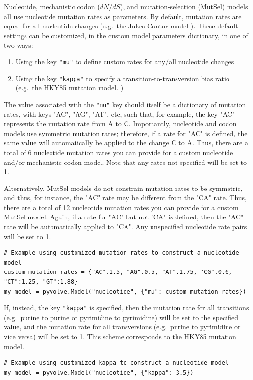 \documentclass{article}
\newcommand{\code}[1]{\texttt{\small{#1}}}
\begin{document}
Nucleotide, mechanistic codon ($dN/dS$), and mutation-selection (MutSel) models all use nucleotide mutation rates as parameters. By default, mutation rates are equal for all nucleotide changes (e.g.\ the Jukes Cantor model \citep{JC69}). These default settings can be customized, in the custom model parameters dictionary, in one of two ways:
\begin{enumerate}
	\item Using the key \code{"mu"} to define custom rates for any/all nucleotide changes
	\item Using the key \code{"kappa"} to specify a transition-to-transversion bias ratio (e.g.\ the HKY85 mutation model. \citep{HKY85})
\end{enumerate}
The value associated with the \code{"mu"} key should itself be a dictionary of mutation rates, with keys "AC", "AG", "AT", etc, such that, for example, the key "AC" represents the mutation rate from A to C. Importantly, nucleotide and codon models use symmetric mutation rates; therefore, if a rate for "AC" is defined, the same value will automatically be applied to the change C to A. Thus, there are a total of 6 nucleotide mutation rates you can provide for a custom nucleotide and/or mechanistic codon model. Note that any rates not specified will be set to 1.

Alternatively, MutSel models do not constrain mutation rates to be symmetric, and thus, for instance, the "AC" rate may be different from the "CA" rate. Thus, there are a total of 12 nucleotide mutation rates you can provide for a custom MutSel model. Again, if a rate for "AC" but not "CA" is defined, then the "AC" rate will be automatically applied to "CA". Any unspecified nucleotide rate pairs will be set to 1. 
\begin{lstlisting}
# Example using customized mutation rates to construct a nucleotide model
custom_mutation_rates = {"AC":1.5, "AG":0.5, "AT":1.75, "CG":0.6, "CT":1.25, "GT":1.88}
my_model = pyvolve.Model("nucleotide", {"mu": custom_mutation_rates})
\end{lstlisting}

If, instead, the key \code{"kappa"} is specified, then the mutation rate for all transitions (e.g.\ purine to purine or pyrimidine to pyrimidine) will be set to the specified value, and the mutation rate for all transversions (e.g.\ purine to pyrimidine or vice versa) will be set to 1. This scheme corresponds to the HKY85 \citep{HKY85} mutation model.
\begin{lstlisting}
# Example using customized kappa to construct a nucleotide model
my_model = pyvolve.Model("nucleotide", {"kappa": 3.5})
\end{lstlisting}
\end{document}
